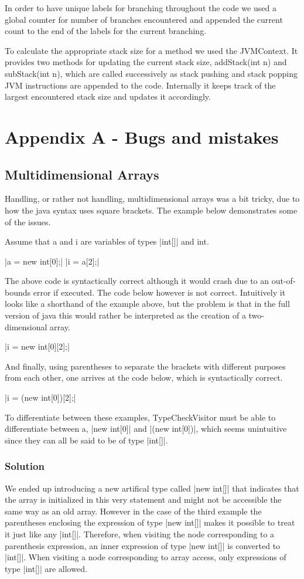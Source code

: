 \documentclass[paper=a4, fontsize=11pt]{scrartcl} %
\numberwithin{equation}{section} %
\numberwithin{figure}{section} %
\numberwithin{table}{section} %
\begin{document}
In order to have unique labels for branching throughout the code we used a global counter for number of branches encountered and appended the current count to the end of the labels for the current branching.

To calculate the appropriate stack size for a method we used the JVMContext. It provides two methods for updating the current stack size, addStack(int n) and subStack(int n), which are called successively as stack pushing and stack popping JVM instructions are appended to the code. Internally it keeps track of the largest encountered stack size and updates it accordingly.

\section{Appendix A - Bugs and mistakes}
\subsection{Multidimensional Arrays}
Handling, or rather not handling, multidimensional arrays was a bit tricky, due to how the java syntax uses square brackets. The example below demonstrates some of the issues.

Assume that a and i are variables of types |int[]| and int.

|a = new int[0];|
|i = a[2];|

The above code is syntactically correct although it would crash due to an out-of-bounds error if executed. The code below however is not correct. Intuitively it looks like a shorthand of the example above, but the problem is that in the full version of java this would rather be interpreted as the creation of a two-dimensional array.

|i = new int[0][2];|

And finally, using parentheses to separate the brackets with different purposes from each other, one arrives at the code below, which is syntactically correct.

|i = (new int[0])[2];|

To differentiate between these examples, TypeCheckVisitor must be able to differentiate between a, |new int[0]| and |(new int[0])|, which seems unintuitive since they can all be said to be of type |int[]|.
\subsubsection*{Solution}
We ended up introducing a new artifical type called |new int[]| that indicates that the array is initialized in this very statement and might not be accessible the same way as an old array. However in the case of the third example the parentheses enclosing the expression of type |new int[]| makes it possible to treat it just like any |int[]|. Therefore, when visiting the node corresponding to a parenthesis expression, an inner expression of type |new int[]| is converted to |int[]|. When visiting a node corresponding to array access, only expressions of type |int[]| are allowed.
\end{document}
